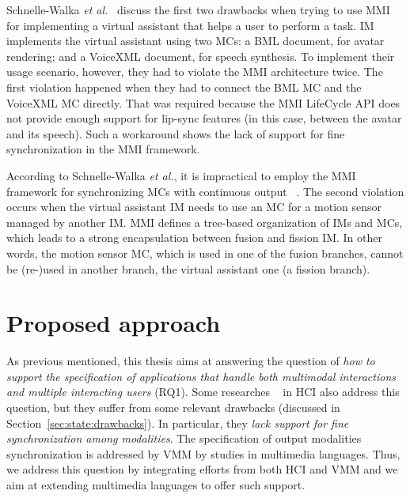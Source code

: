 \documentclass[
  doutorado,
  american
]{ThesisPUC}
\newcommand{\sect}[1]{Section~\ref{#1}}
\begin{document}
Schnelle-Walka \textit{et al.}~\cite{schnelle-walka_jvoicexml_2013} discuss the first
two drawbacks when trying to use MMI for implementing a virtual assistant that
helps a user to perform a task. IM implements the virtual assistant using two
MCs: a BML document, for avatar rendering; and a VoiceXML document, for speech synthesis. To
implement their usage scenario, however, they had to violate the MMI
architecture twice. The first violation happened when they had to connect the
BML MC and the VoiceXML MC directly. That was required because the MMI LifeCycle
API does not provide enough support for lip-sync features (in this case, between
the avatar and its speech). Such a workaround shows the lack of support for fine
synchronization in the MMI framework. 

According to Schnelle-Walka \textit{et al.}, it is impractical to employ the MMI
framework for synchronizing MCs with continuous output
~\cite{schnelle-walka_jvoicexml_2013}. The second violation occurs when the
virtual assistant IM needs to use an MC for a motion sensor managed by another
IM. MMI defines a tree-based organization of IMs and MCs, which leads to a
strong encapsulation between fusion and fission IM. In other words, the motion
sensor MC, which is used in one of the fusion branches, cannot be (re-)used in
another branch, the virtual assistant one (a fission branch).

\chapter{Proposed approach}
\label{chp:approach}

As previous mentioned, this thesis aims at answering the question of\textit{ how
to support the specification of applications that handle both multimodal
interactions and multiple interacting users} (RQ1). Some researches
~\cite{dumas_description_2010, katsurada_xisl:_2005, w3c_multimodal_2003} in HCI
also address this question, but they suffer from some relevant drawbacks
(discussed in \sect{sec:state:drawbacks}). In particular, they \textit{lack 
support for fine
synchronization among modalities}. The specification of output modalities
synchronization is addressed by VMM by studies in multimedia languages. Thus, we
address this question by integrating efforts from both HCI and VMM and we aim at
extending multimedia languages to offer such support.
\end{document}
